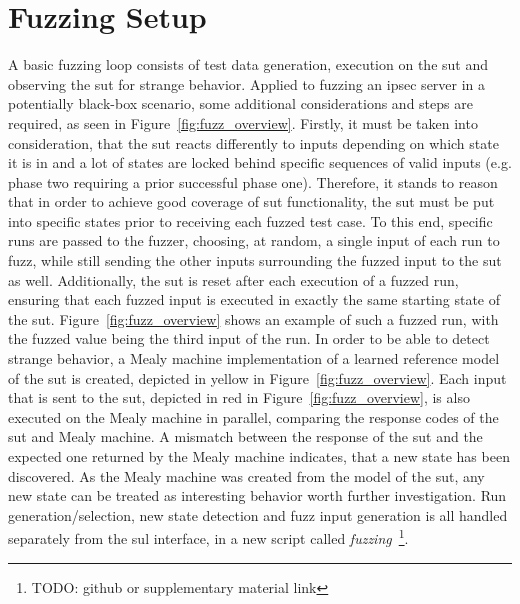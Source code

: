 \section{Fuzzing Setup} \label{sec:fuzz_intro}
A basic fuzzing loop consists of test data generation, execution on the \ac{sut} and observing the \ac{sut} for strange behavior. Applied to fuzzing an \ac{ipsec} server in a potentially black-box scenario, some additional considerations and steps are required, as seen in Figure~\ref{fig:fuzz_overview}. Firstly, it must be taken into consideration, that the \ac{sut} reacts differently to inputs depending on which state it is in and a lot of states are locked behind specific sequences of valid inputs (e.g. phase two requiring a prior successful phase one). Therefore, it stands to reason that in order to achieve good coverage of \ac{sut} functionality, the \ac{sut} must be put into specific states prior to receiving each fuzzed test case. To this end, specific runs are passed to the fuzzer, choosing, at random, a single input of each run to fuzz, while still sending the other inputs surrounding the fuzzed input to the \ac{sut} as well. Additionally, the \ac{sut} is reset after each execution of a fuzzed run, ensuring that each fuzzed input is executed in exactly the same starting state of the \ac{sut}. Figure~\ref{fig:fuzz_overview} shows an example of such a fuzzed run, with the fuzzed value being the third input of the run. In order to be able to detect strange behavior, a Mealy machine implementation of a learned reference model of the \ac{sut} is created, depicted in yellow in Figure~\ref{fig:fuzz_overview}. Each input that is sent to the \ac{sut}, depicted in red in Figure~\ref{fig:fuzz_overview}, is also executed on the Mealy machine in parallel, comparing the response codes of the \ac{sut} and Mealy machine. A mismatch between the response of the \ac{sut} and the expected one returned by the Mealy machine indicates, that a new state has been discovered. As the Mealy machine was created from the model of the \ac{sut}, any new state can be treated as interesting behavior worth further investigation. Run generation/selection, new state detection and fuzz input generation is all handled separately from the \ac{sul} interface, in a new script called \emph{fuzzing}~\footnote{TODO: github or supplementary material link}.

